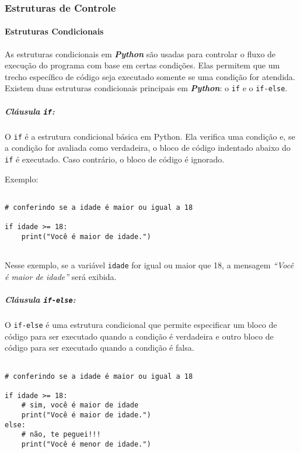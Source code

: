 \documentclass[a4paper, 12pt, onecolumn,singlespacing]{article}
\begin{document}
	\subsubsection{Estruturas de Controle}
	\label{estruturas_de_controle}
	\paragraph{Estruturas Condicionais}
	\label{estruturas_condicionais}
As estruturas condicionais em \textbf{\textit{Python}} são usadas para controlar o fluxo de execução do programa com base em certas condições. Elas permitem que um trecho específico de código seja executado somente se uma condição for atendida. Existem duas estruturas condicionais principais em \textbf{\textit{Python}}: o \texttt{if} e o \texttt{if-else}.
	
	\subparagraph{Cláusula \texttt{if}:}
	\label{python_clausula_if}
	O \texttt{if} é a estrutura condicional básica em Python. Ela verifica uma condição e, se a condição for avaliada como verdadeira, o bloco de código indentado abaixo do \texttt{if} é executado. Caso contrário, o bloco de código é ignorado.
	
	Exemplo:
	\begin{verbatim}
		
# conferindo se a idade é maior ou igual a 18

if idade >= 18:
	print("Você é maior de idade.")
		
	\end{verbatim}

	Nesse exemplo, se a variável \texttt{idade} for igual ou maior que 18, a mensagem \textit{``Você é maior de idade''} será exibida.
	
	\subparagraph{Cláusula \texttt{if-else}:} 
	\label{python_clausula_if_else}
	O \texttt{if-else} é uma estrutura condicional que permite especificar um bloco de código para ser executado quando a condição é verdadeira e outro bloco de código para ser executado quando a condição é falsa.
	
	\begin{verbatim}
		
# conferindo se a idade é maior ou igual a 18
		
if idade >= 18:
	# sim, você é maior de idade
	print("Você é maior de idade.")
else:
	# não, te peguei!!!
	print("Você é menor de idade.")

		
	\end{verbatim}
	\label{clausula_if_else}
	
\end{document}
